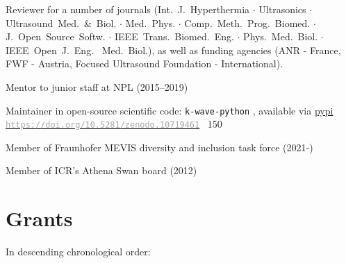 \documentclass[11pt, a4paper]{awesome-cv}
\begin{document}
\begin{cventries}
{}
{}
{\vspace*{-0.5cm}
\begin{cvitems}
\item Reviewer for a number of journals (Int.~J.~Hyperthermia $\cdot$ Ultrasonics $\cdot$ Ultrasound~Med.~\&~Biol. $\cdot$ Med.~Phys. $\cdot$ Comp.~Meth.~Prog.~Biomed. $\cdot$ J.~Open~Source~Softw. $\cdot$ IEEE~Trans.~Biomed.~Eng. $\cdot$ Phys.~Med.~Biol. $\cdot$ IEEE~Open~J.~Eng.~ Med.~Biol.), as well as funding agencies (ANR - France, FWF - Austria, Focused Ultrasound Foundation - International).
\item Mentor to junior staff at NPL (2015--2019)
\item Maintainer in open-source scientific code: \texttt{k-wave-python} \href{https://github.com/waltsims/k-wave-python}{}, available via \href{https://pypi.org/project/k-Wave-python/}{pypi} \newline{}%
\href{https://doi.org/10.5281/zenodo.10719461}{\textcolor{darkgray}{\texttt{https://doi.org/10.5281/zenodo.10719461}}} \hspace*{2cm} \faStarO ~150
\end{cvitems}}

{}
{}
{\vspace*{-0.5cm} %
\begin{cvitems}
\item Member of Fraunhofer MEVIS diversity and inclusion task force (2021-)
\item Member of ICR's Athena Swan board (2012)
\end{cvitems}}
%
\end{cventries}

\hypertarget{grants}{\section{Grants}\label{grants}}

In descending chronological order:
\end{document}
